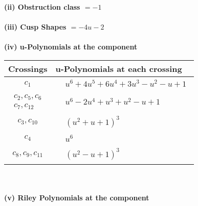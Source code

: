\documentclass[1p]{elsarticle_modified}
\theoremstyle{definition}
\begin{document}
\flushleft \textbf{(ii) Obstruction class $= -1$}\\~\\
\flushleft \textbf{(iii) Cusp Shapes $= -4 u-2$}\\~\\
\newpage\renewcommand{\arraystretch}{1}
\flushleft \textbf{(iv) u-Polynomials at the component}\newline \\
\begin{tabular}{m{50pt}|m{274pt}}
Crossings & \hspace{64pt}u-Polynomials at each crossing \\
\hline $$\begin{aligned}c_{1}\end{aligned}$$&$\begin{aligned}
&u^6+4 u^5+6 u^4+3 u^3- u^2- u+1
\end{aligned}$\\
\hline $$\begin{aligned}c_{2},c_{5},c_{6}\\c_{7},c_{12}\end{aligned}$$&$\begin{aligned}
&u^6-2 u^4+u^3+u^2- u+1
\end{aligned}$\\
\hline $$\begin{aligned}c_{3},c_{10}\end{aligned}$$&$\begin{aligned}
&(u^2+u+1)^3
\end{aligned}$\\
\hline $$\begin{aligned}c_{4}\end{aligned}$$&$\begin{aligned}
&u^6
\end{aligned}$\\
\hline $$\begin{aligned}c_{8},c_{9},c_{11}\end{aligned}$$&$\begin{aligned}
&(u^2- u+1)^3
\end{aligned}$\\
\hline
\end{tabular}\\~\\
\newpage\renewcommand{\arraystretch}{1}
\flushleft \textbf{(v) Riley Polynomials at the component}\newline \\
\end{document}

